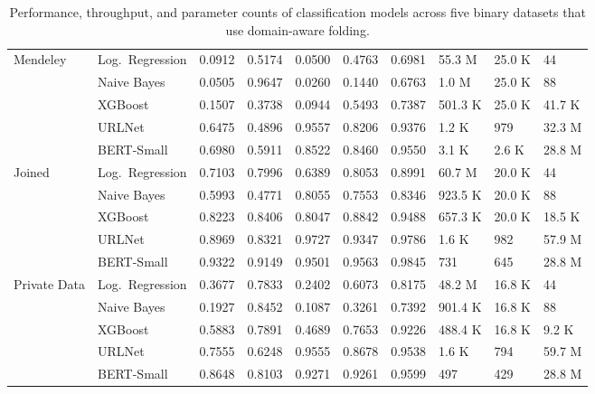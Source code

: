 \begin{table}[H]
{\begin{tabular}{
            >{\raggedright\arraybackslash}p{3cm}
            lllllllll
            }
            Mendeley
                             & Log.\ Regression         & 0.0912 & 0.5174 & 0.0500 & 0.4763 & 0.6981 & 55.3 M  & 25.0 K & 44     \\
                             & Naive Bayes              & 0.0505 & 0.9647 & 0.0260 & 0.1440 & 0.6763 & 1.0 M   & 25.0 K & 88     \\
                             & XGBoost                  & 0.1507 & 0.3738 & 0.0944 & 0.5493 & 0.7387 & 501.3 K & 25.0 K & 41.7 K \\
                             & URLNet                   & 0.6475 & 0.4896 & 0.9557 & 0.8206 & 0.9376 & 1.2 K   & 979    & 32.3 M \\
                             & BERT-Small               & 0.6980 & 0.5911 & 0.8522 & 0.8460 & 0.9550 & 3.1 K   & 2.6 K  & 28.8 M \\
            \addlinespace

            Joined
                             & Log.\ Regression         & 0.7103 & 0.7996 & 0.6389 & 0.8053 & 0.8991 & 60.7 M  & 20.0 K & 44     \\
                             & Naive Bayes              & 0.5993 & 0.4771 & 0.8055 & 0.7553 & 0.8346 & 923.5 K & 20.0 K & 88     \\
                             & XGBoost                  & 0.8223 & 0.8406 & 0.8047 & 0.8842 & 0.9488 & 657.3 K & 20.0 K & 18.5 K \\
                             & URLNet                   & 0.8969 & 0.8321 & 0.9727 & 0.9347 & 0.9786 & 1.6 K   & 982    & 57.9 M \\
                             & BERT-Small               & 0.9322 & 0.9149 & 0.9501 & 0.9563 & 0.9845 & 731     & 645    & 28.8 M \\
            \addlinespace

            Private Data
                             & Log.\ Regression         & 0.3677 & 0.7833 & 0.2402 & 0.6073 & 0.8175 & 48.2 M  & 16.8 K & 44     \\
                             & Naive Bayes              & 0.1927 & 0.8452 & 0.1087 & 0.3261 & 0.7392 & 901.4 K & 16.8 K & 88     \\
                             & XGBoost                  & 0.5883 & 0.7891 & 0.4689 & 0.7653 & 0.9226 & 488.4 K & 16.8 K & 9.2 K  \\
                             & URLNet                   & 0.7555 & 0.6248 & 0.9555 & 0.8678 & 0.9538 & 1.6 K   & 794    & 59.7 M \\
                             & BERT-Small               & 0.8648 & 0.8103 & 0.9271 & 0.9261 & 0.9599 & 497     & 429    & 28.8 M \\
            \bottomrule
        \end{tabular}
    }
    \caption{Performance, throughput, and parameter counts of classification models across five binary datasets that use domain-aware folding.}
    \label{tab:baseline_binary_classification_results}
\end{table}

